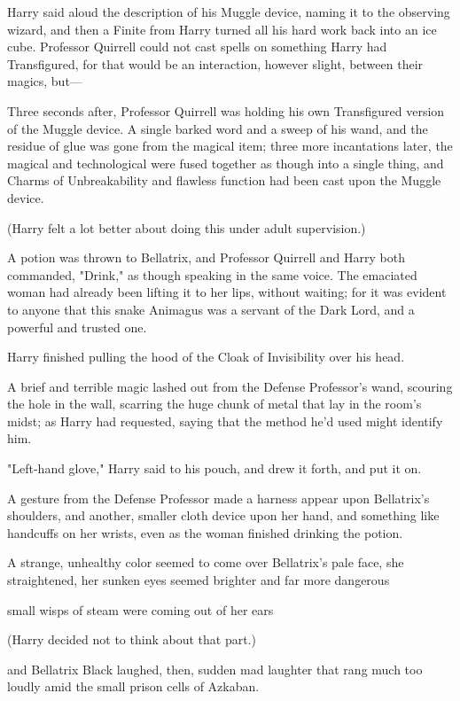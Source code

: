 Harry said aloud the description of his Muggle device, naming it to the
observing wizard, and then a Finite from Harry turned all his hard work back
into an ice cube. Professor Quirrell could not cast spells on something Harry
had Transfigured, for that would be an interaction, however slight, between
their magics, but---

Three seconds after, Professor Quirrell was holding his own Transfigured
version of the Muggle device. A single barked word and a sweep of his wand, and
the residue of glue was gone from the magical item; three more incantations
later, the magical and technological were fused together as though into a
single thing, and Charms of Unbreakability and flawless function had been cast
upon the Muggle device.

(Harry felt a lot better about doing this under adult supervision.)

A potion was thrown to Bellatrix, and Professor Quirrell and Harry both
commanded, "Drink," as though speaking in the same voice. The emaciated woman
had already been lifting it to her lips, without waiting; for it was evident to
anyone that this snake Animagus was a servant of the Dark Lord, and a powerful
and trusted one.

Harry finished pulling the hood of the Cloak of Invisibility over his head.

A brief and terrible magic lashed out from the Defense Professor's wand,
scouring the hole in the wall, scarring the huge chunk of metal that lay in the
room's midst; as Harry had requested, saying that the method he'd used might
identify him.

"Left-hand glove," Harry said to his pouch, and drew it forth, and put it on.

A gesture from the Defense Professor made a harness appear upon Bellatrix's
shoulders, and another, smaller cloth device upon her hand, and something like
handcuffs on her wrists, even as the woman finished drinking the potion.

A strange, unhealthy color seemed to come over Bellatrix's pale face, she
straightened, her sunken eyes seemed brighter and far more dangerous{\el}

{\el} small wisps of steam were coming out of her ears{\el}

(Harry decided not to think about that part.)

{\el} and Bellatrix Black laughed, then, sudden mad laughter that rang much
too loudly amid the small prison cells of Azkaban.

